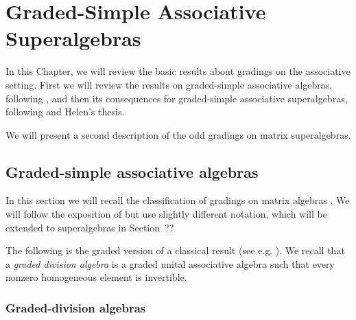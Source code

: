 \chapter{Graded-Simple Associative Superalgebras}\label{chap:A-type-I}

In this Chapter, we will review the basic results about gradings on the associative setting.
First we will review the results on graded-simple associative algebras, following \cite{BK10}, and then its consequences for graded-simple associative superalgebras, following \cite{paper-MAP} and Helen's thesis.

We will present a second description of the odd gradings on matrix superalgebras.


\section{Graded-simple associative algebras}

In this section we will recall the classification of gradings on matrix algebras \cite{BSZ01, BZ02, BK10}. 
We will follow the exposition of \cite[Chapter 2]{livromicha} but use slightly different notation, which will be extended to superalgebras in Section~??%

The following is the graded version of a classical result (see e.g. \cite[Theorem 2.6]{livromicha}).
We recall that a \emph{graded division algebra} is a graded unital associative algebra such that every nonzero homogeneous element is invertible.

\subsection{Graded-division algebras}\label{ssec:grd-div-alg}


